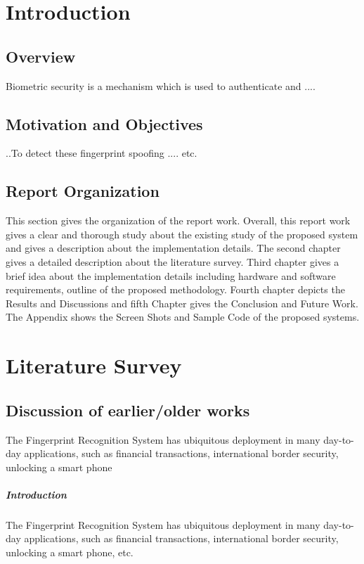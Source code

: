\chapter{Introduction}
\section{Overview}
Biometric security is a mechanism which is used to authenticate and ....
\section{Motivation and Objectives} 
..To detect these fingerprint spoofing .... etc.

\section{Report Organization}
This section gives the organization of the report work. Overall, this report work gives a clear and thorough study about the existing study of the proposed system and gives a description about the implementation details. The second chapter gives a detailed description about the literature survey. Third chapter gives a brief idea about the implementation details including hardware and software requirements, outline of the proposed methodology. Fourth chapter depicts the Results and Discussions and fifth Chapter gives the Conclusion and Future Work. The Appendix shows the Screen Shots and Sample Code of the proposed systems.
\chapter{Literature Survey}
\section{Discussion of earlier/older works}
The Fingerprint Recognition System has ubiquitous deployment in many day-to-day applications, such as financial transactions, international border security, unlocking a smart phone\cite{1}

\paragraph{\textbf{Introduction}}
The Fingerprint Recognition System has ubiquitous deployment in many day-to-day applications, such 
as financial transactions,\cite{4} international border security, unlocking a smart phone, etc.
